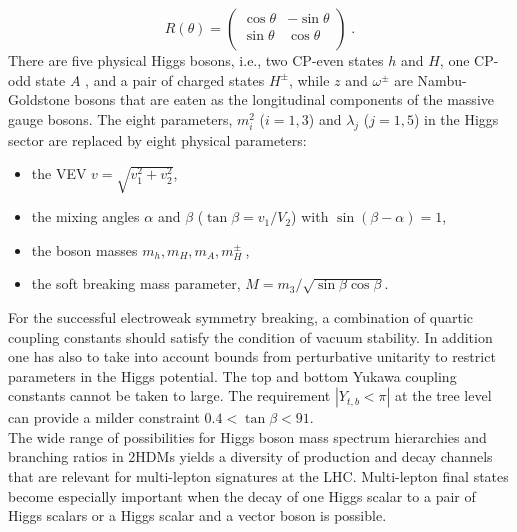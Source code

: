 \begin{equation}
R(\theta)=
\left(
\begin{array}{lr}
\cos \theta & -\sin \theta   \\
\sin \theta & \cos \theta  \\
\end{array}
\right)
\;. \end{equation}
There are five physical Higgs bosons,  i.e., two CP-even states $h$ and $H$, one CP-odd state $A$
, and a pair of charged states $H^{\pm}$, while $z$ and $\omega^{\pm}$ are Nambu-Goldstone bosons that are eaten as the longitudinal components of the massive 
gauge bosons. The eight parameters, $m_i^2$ ($i=1,3$) and $\lambda_j$ ($j=1,5$) in the Higgs sector are replaced by eight physical parameters:
\begin{itemize}
\item the VEV $v=\sqrt{v_1^2+ v_2^2}$,
\item the mixing angles $\alpha$ and $\beta$ ($\tan \beta= v_1/V_2 $) with $\sin( \beta -\alpha)=1 $,
\item the boson masses $m_h, m_H,m_A,m_H^{\pm} \:$,
\item the soft breaking mass parameter, $M=m_3/\sqrt{\sin \beta \cos \beta}$.
\end{itemize}
For the successful electroweak symmetry breaking, a combination of quartic coupling constants should satisfy the condition of vacuum stability.
In addition one has also to take into account
bounds from perturbative unitarity to restrict parameters in the Higgs potential.
The top and bottom Yukawa coupling constants cannot be taken to
 large. The requirement $|Y_{t,b}< \pi|$  at the tree level can provide a milder constraint $0.4 <\tan \beta <91$.\\
The  wide  range  of  possibilities  for  Higgs  boson  mass  spectrum  hierarchies  and  branching
ratios  in  2HDMs  yields  a  diversity  of  production  and  decay  channels  that  are  relevant  for
multi-lepton  signatures  at  the  LHC.  Multi-lepton  final  states  become  especially  important
when the decay of one Higgs scalar to a pair of Higgs scalars or a Higgs scalar and a vector
boson is possible. 



